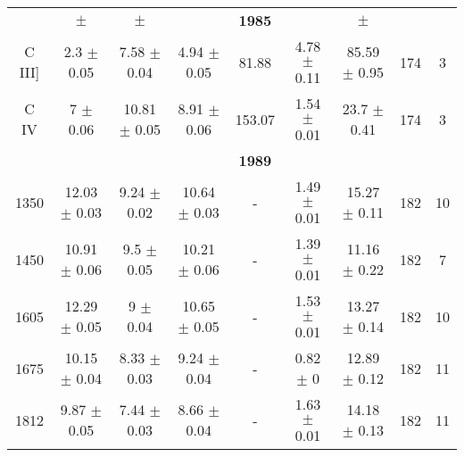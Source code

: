 \documentclass[
  man,floatsintext]{apa6}
\begin{document}
\begin{landscape}
\begin{longtable}{@{\extracolsep{\fill}} cc cc cc cc c}
                                                                                                                    
    &       $\pm$       &       $\pm$       &                   &   \textbf{1985}       &       &       $\pm$       &       &       \\      
                                                                                                                    
    C III]  &   2.3 $\pm$   0.05    &   7.58    $\pm$   0.04    &   4.94    $\pm$   0.05    &   81.88   &   4.78    $\pm$   0.11    &   85.59   $\pm$   0.95    &   174 &   3   \\  
                                                                                                                    
    C IV    &   7   $\pm$   0.06    &   10.81   $\pm$   0.05    &   8.91    $\pm$   0.06    &   153.07  &   1.54    $\pm$   0.01    &   23.7    $\pm$   0.41    &   174 &   3   \\  \hline \hline
                                                                                                                    
    &               &               &                   &   \textbf{1989}               &               &       &       \\      
                                                                                                                    
    1350    &   12.03   $\pm$   0.03    &   9.24    $\pm$   0.02    &   10.64   $\pm$   0.03    &   -   &   1.49    $\pm$   0.01    &   15.27   $\pm$   0.11    &   182 &   10  \\  
    1450    &   10.91   $\pm$   0.06    &   9.5 $\pm$   0.05    &   10.21   $\pm$   0.06    &   -   &   1.39    $\pm$   0.01    &   11.16   $\pm$   0.22    &   182 &   7   \\  
    1605    &   12.29   $\pm$   0.05    &   9   $\pm$   0.04    &   10.65   $\pm$   0.05    &   -   &   1.53    $\pm$   0.01    &   13.27   $\pm$   0.14    &   182 &   10  \\  
    1675    &   10.15   $\pm$   0.04    &   8.33    $\pm$   0.03    &   9.24    $\pm$   0.04    &   -   &   0.82    $\pm$   0   &   12.89   $\pm$   0.12    &   182 &   11  \\  
                                                                                                                    
    1812    &   9.87    $\pm$   0.05    &   7.44    $\pm$   0.03    &   8.66    $\pm$   0.04    &   -   &   1.63    $\pm$   0.01    &   14.18   $\pm$   0.13    &   182 &   11  \\  
                                                                                                                    

\end{longtable}
\end{landscape}
\end{document}
